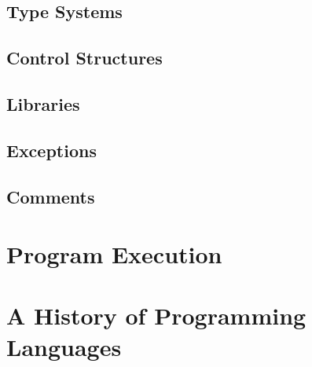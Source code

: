 
\subsection{Type Systems}


\subsection{Control Structures}


\subsection{Libraries}


\subsection{Exceptions}


\subsection{Comments}


\toclineskip
\section{Program Execution}


\toclineskip
\section{A History of Programming Languages}

